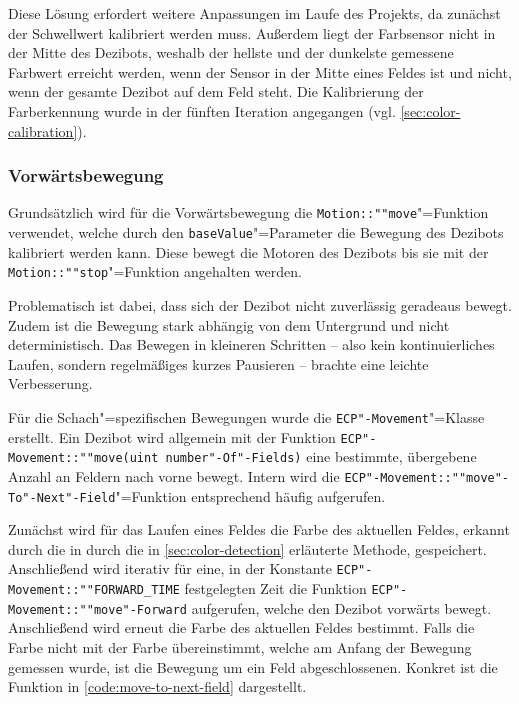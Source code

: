 Diese Lösung erfordert weitere Anpassungen im Laufe des Projekts, da zunächst der Schwellwert kalibriert werden muss. Außerdem liegt der Farbsensor nicht in der Mitte des Dezibots, weshalb der hellste und der dunkelste gemessene Farbwert erreicht werden, wenn der Sensor in der Mitte eines Feldes ist und nicht, wenn der gesamte Dezibot auf dem Feld steht. Die Kalibrierung der Farberkennung wurde in der fünften Iteration angegangen (vgl. \autoref{sec:color-calibration}).


\subsubsection{Vorwärtsbewegung}
\label{sec:move-straight}

Grundsätzlich wird für die Vorwärtsbewegung die \texttt{Motion::""move}"=Funktion verwendet, welche durch den \texttt{baseValue}"=Parameter die Bewegung des Dezibots kalibriert werden kann. Diese bewegt die Motoren des Dezibots bis sie mit der \texttt{Motion::""stop}"=Funktion angehalten werden.

Problematisch ist dabei, dass sich der Dezibot nicht zuverlässig geradeaus bewegt. Zudem ist die Bewegung stark abhängig von dem Untergrund und nicht deterministisch. Das Bewegen in kleineren Schritten -- also kein kontinuierliches Laufen, sondern regelmäßiges kurzes Pausieren -- brachte eine leichte Verbesserung. 

Für die Schach"=spezifischen Bewegungen wurde die \texttt{ECP"-Movement}"=Klasse erstellt. Ein Dezibot wird allgemein mit der Funktion \texttt{ECP"-Movement::""move(uint number"-Of"-Fields)} eine bestimmte, übergebene Anzahl an Feldern nach vorne bewegt. Intern wird die \texttt{ECP"-Movement::""move"-To"-Next"-Field}"=Funktion entsprechend häufig aufgerufen.

Zunächst wird für das Laufen eines Feldes die Farbe des aktuellen Feldes, erkannt durch die in durch die in \autoref{sec:color-detection} erläuterte Methode, gespeichert. Anschließend wird iterativ für eine, in der Konstante \texttt{ECP"-Movement::""FORWARD\_TIME} festgelegten Zeit die Funktion \texttt{ECP"-Movement::""move"-Forward} aufgerufen, welche den Dezibot vorwärts bewegt. Anschließend wird erneut die Farbe des aktuellen Feldes bestimmt. Falls die Farbe nicht mit der Farbe übereinstimmt, welche am Anfang der Bewegung gemessen wurde, ist die Bewegung um ein Feld abgeschlossenen. Konkret ist die Funktion in \autoref{code:move-to-next-field} dargestellt.

